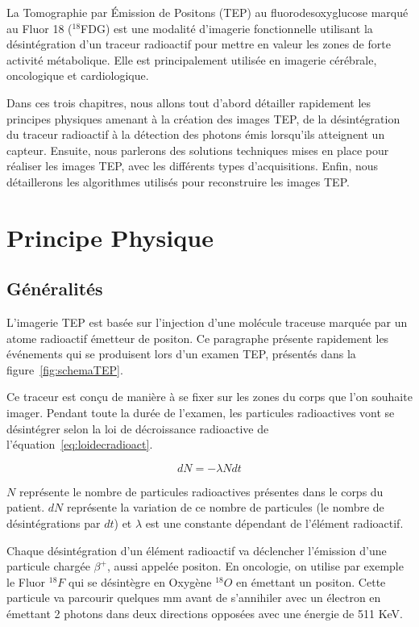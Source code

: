 \pagestyle{fancyplain}

\label{lab:chapPET}
La Tomographie par \'Emission de Positons (TEP) au fluorodesoxyglucose marqué au Fluor 18 ($^{18}$FDG) est une modalité d'imagerie fonctionnelle utilisant la désintégration d'un traceur radioactif pour mettre en valeur les zones de forte activité métabolique. Elle est principalement utilisée en imagerie cérébrale, oncologique et cardiologique.


Dans ces trois chapitres, nous allons tout d'abord détailler rapidement les principes physiques amenant à la création des images TEP, de la désintégration du traceur radioactif à la détection des photons émis lorsqu'ils atteignent un capteur. Ensuite, nous parlerons des solutions techniques mises en place pour réaliser les images TEP, avec les différents types d'acquisitions. Enfin, nous détaillerons les algorithmes utilisés pour reconstruire les images TEP.

 
\chapter{Principe Physique}

	\section{Généralités}

L'imagerie TEP est basée sur l'injection d'une molécule traceuse marquée par un atome radioactif émetteur de positon. Ce paragraphe présente rapidement les événements qui se produisent lors d'un examen TEP, présentés dans la figure~\ref{fig:schemaTEP}.

Ce traceur est conçu de manière à se fixer sur les zones du corps que l'on souhaite imager. Pendant toute la durée de l'examen, les particules radioactives vont se désintégrer selon la loi de décroissance radioactive de l'équation~\ref{eq:loidecradioact}.

\begin{equation}
	dN = - \lambda N dt
	\label{eq:loidecradioact}
\end{equation}

$N$ représente le nombre de particules radioactives présentes dans le corps du patient. $dN$ représente la variation de ce nombre de particules (le nombre de désintégrations par $dt$) et $\lambda$ est une constante dépendant de l'élément radioactif.

Chaque désintégration d'un élément radioactif va déclencher l'émission d'une particule chargée $\beta^+$, aussi appelée positon. En oncologie, on utilise par exemple le Fluor $^{18}F$ qui se désintègre en Oxygène $^{18}O$ en émettant un positon. Cette particule va parcourir quelques mm avant de s'annihiler avec un électron en émettant 2 photons dans deux directions opposées avec une énergie de 511 KeV.

